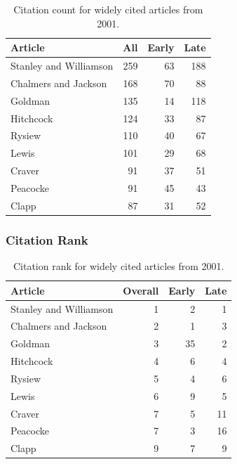 \documentclass[
  10pt,
  letterpaper,
  DIV=11,
  numbers=noendperiod,
  twoside]{scrartcl}
\begin{document}
\begin{longtable}[]{@{}lrrr@{}}

\caption{\label{tbl-citation-count-2001}Citation count for widely cited
articles from 2001.}

\tabularnewline

\toprule\noalign{}
Article & All & Early & Late \\
\midrule\noalign{}
\endhead
\bottomrule\noalign{}
\endlastfoot
Stanley and Williamson & 259 & 63 & 188 \\
Chalmers and Jackson & 168 & 70 & 88 \\
Goldman & 135 & 14 & 118 \\
Hitchcock & 124 & 33 & 87 \\
Rysiew & 110 & 40 & 67 \\
Lewis & 101 & 29 & 68 \\
Craver & 91 & 37 & 51 \\
Peacocke & 91 & 45 & 43 \\
Clapp & 87 & 31 & 52 \\

\end{longtable}

\subsubsection*{Citation Rank}\label{sec-rank-2001}

\begin{longtable}[]{@{}lrrr@{}}

\caption{\label{tbl-citation-rank-2001}Citation rank for widely cited
articles from 2001.}

\tabularnewline

\toprule\noalign{}
Article & Overall & Early & Late \\
\midrule\noalign{}
\endhead
\bottomrule\noalign{}
\endlastfoot
Stanley and Williamson & 1 & 2 & 1 \\
Chalmers and Jackson & 2 & 1 & 3 \\
Goldman & 3 & 35 & 2 \\
Hitchcock & 4 & 6 & 4 \\
Rysiew & 5 & 4 & 6 \\
Lewis & 6 & 9 & 5 \\
Craver & 7 & 5 & 11 \\
Peacocke & 7 & 3 & 16 \\
Clapp & 9 & 7 & 9 \\

\end{longtable}
\end{document}
